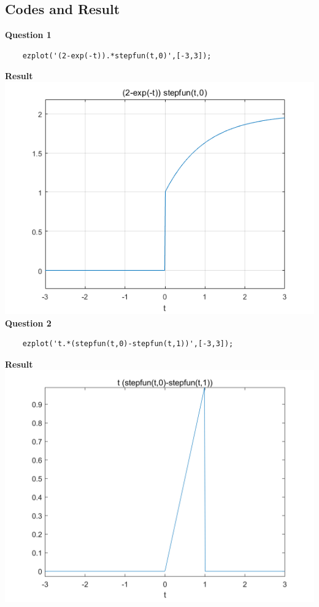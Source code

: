 \documentclass[UTF8,a4paper]{article}
\begin{document}
\subsection{Codes and Result}
\textbf{Question 1}
\begin{lstlisting}
    ezplot('(2-exp(-t)).*stepfun(t,0)',[-3,3]);
\end{lstlisting}
\textbf{Result}\\
\includegraphics[scale=0.6]{1-1.png}\\
\textbf{Question 2}\\
\begin{lstlisting}
    ezplot('t.*(stepfun(t,0)-stepfun(t,1))',[-3,3]);
\end{lstlisting}
\textbf{Result}\\
\includegraphics[scale=0.6]{1-2.png}\\
\end{document}
